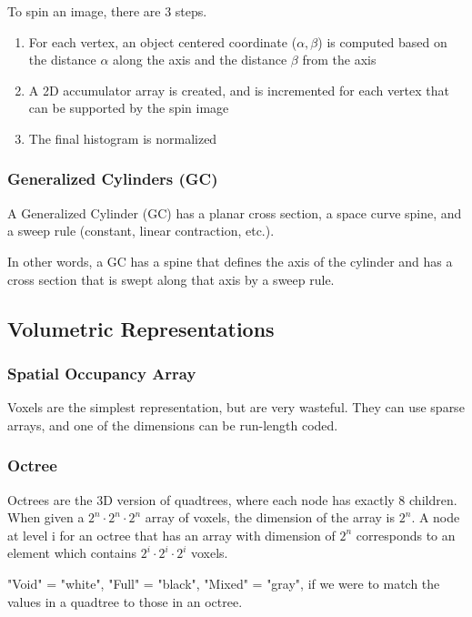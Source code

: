 \documentclass{article}
\begin{document}
\begin{multicols}{2}
To spin an image, there are 3 steps.
\begin{enumerate}
  \item {For each vertex, an object centered coordinate ($\alpha, \beta$) is computed based on the distance $\alpha$ along the axis and the distance $\beta$ from the axis}
  \item {A 2D accumulator array is created, and is incremented for each vertex that can be supported by the spin image}
  \item {The final histogram is normalized}
\end{enumerate}

\subsubsection{Generalized Cylinders (GC)}

A Generalized Cylinder (GC) has a planar cross section, a space curve spine, and a sweep rule (constant, linear contraction, etc.).

In other words, a GC has a spine that defines the axis of the cylinder and has a cross section that is swept along that axis by a sweep rule.

\subsection{Volumetric Representations}
\subsubsection{Spatial Occupancy Array}

Voxels are the simplest representation, but are very wasteful. They can use sparse arrays, and one of the dimensions can be run-length coded.

\subsubsection{Octree}

Octrees are the 3D version of quadtrees, where each node has exactly 8 children. When given a $2^n \cdot 2^n \cdot 2^n$ array of voxels, the dimension of the array is $2^n$. A node at level i for an octree that has an array with dimension of $2^n$ corresponds to an element which contains $2^i \cdot 2^i \cdot 2^i$ voxels.

"Void" = "white", "Full" = "black", "Mixed" = "gray", if we were to match the values in a quadtree to those in an octree.


\end{multicols}
\end{document}
